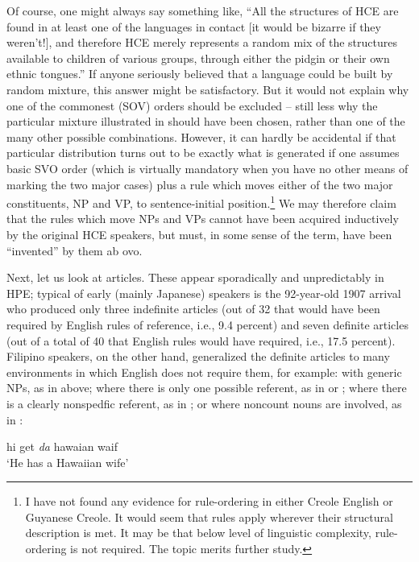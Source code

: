 Of course, one might always say something like, ``All the struc\-tures of HCE are found in at least one of the languages in contact [it would be bizarre if they weren't!], and therefore HCE merely repre\-sents a random mix of the structures available to children of various groups, through either the pidgin or their own ethnic tongues.'' If anyone seriously believed that a language could be built by random mixture, this answer might be satisfactory. But it would not explain why one of the commonest (SOV) orders should be excluded -- still less why the particular mixture illustrated in  should have been chosen, rather than one of the many other possible combinations. However, it can hardly be accidental if that particular distribution turns out to be exactly what is generated if one assumes basic SVO order (which is virtually mandatory when you have no other means of mark\-ing the two major cases) plus a rule which moves either of the two
major constituents, NP and VP, to sentence-initial position.\footnote{I have not found any evidence for rule-ordering in either Creole English or Guyanese Creole. It would seem that rules apply wherever their structural description is met. It may be that below level of linguistic complexity, rule-ordering is not required. The topic merits further study.} We may therefore claim that the rules which move NPs and VPs cannot have been acquired inductively by the original HCE speakers, but must, in some sense of the term, have been ``invented'' by them ab ovo.

Next, let us look at articles. These appear sporadically and unpredictably in HPE; typical of early (mainly Japanese) speakers is the 92-year-old 1907 arrival who produced only three indefinite articles (out of 32 that would have been required by English rules of reference, i.e., 9.4 percent) and seven definite articles (out of a total of 40 that English rules would have required, i.e., 17.5 percent). Filipino speakers, on the other hand, generalized the definite articles to many environ\-ments in which English does not require them, for example: with generic NPs, as in  above; where there is only one possible refer\-ent, as in  or ; where there is a clearly nonspedfic referent, as in ; or where noncount nouns are involved, as in :

\ea\label{ex:30}
 hi get \textit{da} hawaian waif \\
\glt  `He has a Hawaiian wife'
\z

